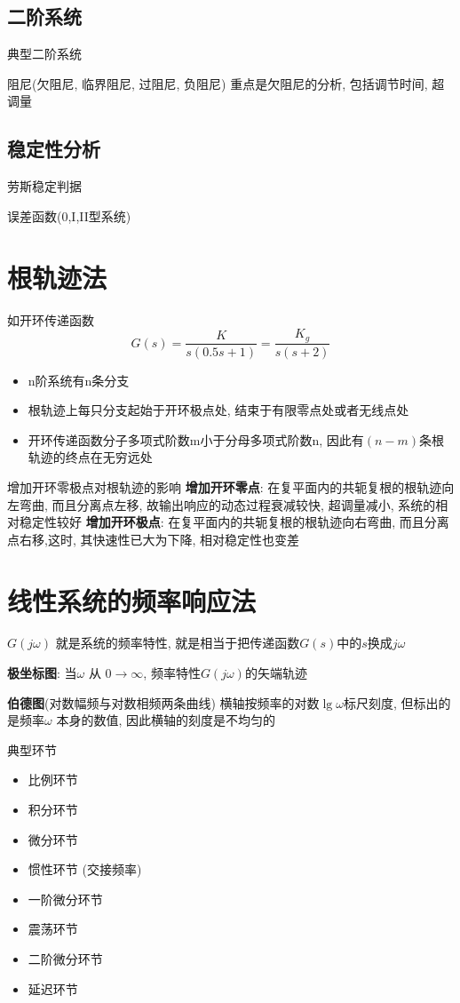 \documentclass{article}
\begin{document}
\subsection{二阶系统}
典型二阶系统

阻尼(欠阻尼, 临界阻尼, 过阻尼, 负阻尼)
\newline 重点是欠阻尼的分析, 包括调节时间, 超调量

\subsection{稳定性分析}
劳斯稳定判据

误差函数(0,I,II型系统)

\section{根轨迹法}
如开环传递函数
$$
G(s) = \frac{ K}{s(0.5s+1)} = \frac{K_g}{s(s+2)}
$$
\begin{itemize}
	\item n阶系统有n条分支
	\item 根轨迹上每只分支起始于开环极点处, 结束于有限零点处或者无线点处
	\item 开环传递函数分子多项式阶数m小于分母多项式阶数n, 因此有$(n-m)$条根轨迹的终点在无穷远处
\end{itemize}

增加开环零极点对根轨迹的影响\newline
\textbf{增加开环零点}: 在复平面内的共轭复根的根轨迹向左弯曲, 而且分离点左移, 故输出响应的动态过程衰减较快, 超调量减小, 系统的相对稳定性较好\newline
\textbf{增加开环极点}: 在复平面内的共轭复根的根轨迹向右弯曲, 而且分离点右移,这时, 其快速性已大为下降, 相对稳定性也变差

\section{线性系统的频率响应法}
$G(j\omega)$ 就是系统的频率特性, 就是相当于把传递函数$G(s)$中的$s$换成$j\omega$

\textbf{极坐标图}: 当$\omega$ 从 $0 \to \infty$, 频率特性$G(j\omega)$的矢端轨迹

\textbf{伯德图}(对数幅频与对数相频两条曲线)\newline
横轴按频率的对数$\lg \omega$标尺刻度, 但标出的是频率$\omega$ 本身的数值, 因此横轴的刻度是不均匀的

典型环节
\begin{itemize}
  \item 比例环节
  \item 积分环节
  \item 微分环节
  \item 惯性环节 (交接频率)
  \item 一阶微分环节
  \item 震荡环节
  \item 二阶微分环节
  \item 延迟环节
\end{itemize}
\end{document}
